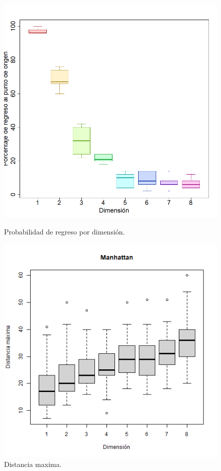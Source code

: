 \documentclass{article}
\begin{document}
\begin{figure}

 \begin{center}
\includegraphics[scale=0.3]{tareaunosim.png}
\end{center}
  \caption{Probabilidad de regreso por dimensi\'on.}
  \label{f1}
  
\includegraphics[scale=0.5]{tareaunomr.png}
 \caption{Distancia maxima.}
  \label{f2}
 
\end{figure}
 
\end{document}
